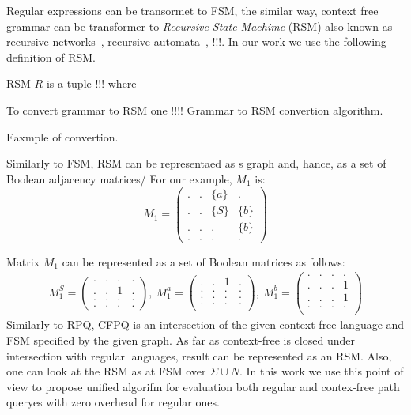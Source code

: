 Regular expressions can be transormet to FSM, the similar way, context free grammar can be transformer to \textit{Recursive State Machime} (RSM) also known as recursive networks~\cite{!!!}, recursive automata~\cite{!!!}, !!!. 
In our work we use the following definition of RSM.
\begin{definition}
RSM $R$ is a tuple !!! where
\end{definition}

To convert grammar to RSM one !!!!
Grammar to RSM convertion algorithm.

Eaxmple of convertion.



Similarly to FSM, RSM can be representaed as s graph and, hance, as a set of Boolean adjacency matrices/
For our example, $M_1$ is:
    $$
    M_1 =
    \begin{pmatrix}
    . & . & \{a\} & .     \\
    . & . & \{S\} & \{b\} \\
    . & . & . & \{b\}     \\
    . & . & . & .
    \end{pmatrix}
    $$

Matrix $M_1$ can be represented as a set of Boolean matrices as follows:
{\small
\begin{align*}
M_1^S =
\begin{pmatrix}      
    . & . & . & .   \\
    . & . & 1 & .   \\
    . & . & . & .   \\
    . & . & . & .   
\end{pmatrix},~M_1^a =
\begin{pmatrix}       
   . & . & 1 & .   \\
   . & . & . & .   \\
   . & . & . & .   \\
   . & . & . & .   \\
\end{pmatrix},~M_1^b =
\begin{pmatrix}      
    . & . & . & .   \\
    . & . & . & 1   \\
    . & . & . & 1   \\
    . & . & . & .   \\
\end{pmatrix}
\end{align*}
}
Similarly to RPQ, CFPQ is an intersection of the given context-free language and FSM specified by the given graph.
As far as context-free is closed under intersection with regular languages, result can be represented as an RSM.
Also, one can look at the RSM as at FSM over $\Sigma \cup N$.
In this work we use this point of view to propose unified algorifm for evaluation both regular and contex-free path queryes with zero overhead for regular ones. 
 

